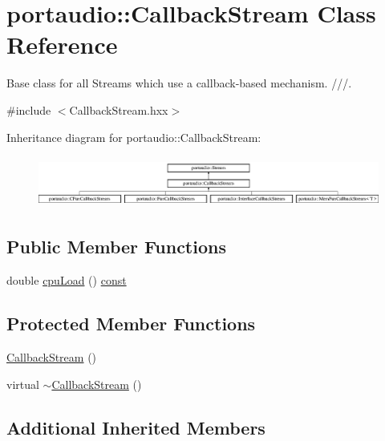 \hypertarget{classportaudio_1_1_callback_stream}{}\section{portaudio\+:\+:Callback\+Stream Class Reference}
\label{classportaudio_1_1_callback_stream}


Base class for all Streams which use a callback-\/based mechanism. ///.  




{\ttfamily \#include $<$Callback\+Stream.\+hxx$>$}

Inheritance diagram for portaudio\+:\+:Callback\+Stream\+:\begin{figure}[H]
\begin{center}
\leavevmode
\includegraphics[height=1.700405cm]{classportaudio_1_1_callback_stream}
\end{center}
\end{figure}
\subsection*{Public Member Functions}
\begin{DoxyCompactItemize}
\item 
double \hyperlink{classportaudio_1_1_callback_stream_ac160edccc0cdcbcdf7752fdc93b22851}{cpu\+Load} () \hyperlink{getopt1_8c_a2c212835823e3c54a8ab6d95c652660e}{const} 
\end{DoxyCompactItemize}
\subsection*{Protected Member Functions}
\begin{DoxyCompactItemize}
\item 
\hyperlink{classportaudio_1_1_callback_stream_a750ba88ff4fa5deb3f7317a156db4e23}{Callback\+Stream} ()
\item 
virtual \hyperlink{classportaudio_1_1_callback_stream_a3ca8cbafc119dfcaa0937f7781c07b08}{$\sim$\+Callback\+Stream} ()
\end{DoxyCompactItemize}
\subsection*{Additional Inherited Members}



